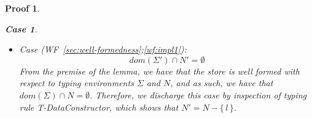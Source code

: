 \documentclass[showabstract,showacknowledgments,showpreface,showdedication,school]{iuphd}
\newtheorem*{bcase}{Case}
\theoremstyle{nonumberplain}
\newtheorem{nproof}{Proof}
\newcommand{\keywd}[1]{\mathit{#1}}
\newcommand{\skeywd}[1]{\mathit{#1}}
\newcommand{\TYP}{\keywd{\tau}}
\newcommand{\loc}{\skeywd{l}}
\newcommand{\concreteloc}[3]{\ensuremath{\langle #1, #2 \rangle ^{#3}}}
\newcommand{\reg}{\skeywd{r}}
\newcommand{\STOR}{\keywd{S}}
\newcommand\set[1]{\{ \, \ensuremath{#1} \,\}}
\newcommand{\SENV}{\keywd{\Sigma}}
\newcommand{\MENV}{\keywd{M}}
\newcommand{\AENV}{\keywd{A}}
\newcommand{\NENV}{\keywd{N}}
\newcommand{\locreg}[2]{\ensuremath{{#1}^{#2}}}
\newcommand{\allocptr}[2]{\keywd{MaxIdx}(#1,#2)}
\newcommand{\ewitness}[4]{\ensuremath{#1;#2;#3 \vdash_{ew} #4}}
\newcommand{\refwellformed}[2]{WF~\ref{#1};\ref{#2}}
\newcommand{\tdatacon}{T-DataConstructor}
\newcommand{\tconcreteloc}{T-Concrete-Loc}
\newcommand{\overharpoon}[1]{\overrightharpoon{#1}}
\begin{document}
\begin{nproof}
\begin{bcase}
\begin{itemize}
\begin{itemize}
\begin{itemize}
      \refwellformed{sec:well-formedness-allocation}{wf:impl-linear-alloc2}
      to the end witness of the last constructor argument, i.e.,
      \begin{align*}
      (\reg \mapsto \overharpoon{\locreg{\loc}{\reg}_n}) \in A \wedge
    \, (\overharpoon{\locreg{\loc}{\reg}_n} \mapsto \concreteloc{\reg}{\overharpoon{w_n}}{}) \in \MENV \wedge
    \, \ewitness{\TYP}{\concreteloc{\reg}{\overharpoon{w_n}}{}}{\STOR}{\concreteloc{\reg}{\overharpoon{w_{n+1}}}{}}
      \end{align*}
      The first two conjuncts follow from inversion on \tdatacon{}
      and \tconcreteloc{}, respectively, and the final one from Property~\ref{prf:dc-ew-f2}.
      Thus, we have that $\overharpoon{w_{n+1}} > \allocptr{\reg}{\STOR}$.
      It follows that $\overharpoon{w_{n+1}} > \allocptr{\reg}{\STOR'}$, because the
      newly written address in $\STOR'$, namely $i_1$, is such that $i_1 < \overharpoon{w_{n+1}}$.
      By defintion of the end witness, we discharge this case by establishing that
      $\overharpoon{w_{n+1}} = i_2 > \allocptr{\reg}{\STOR'}$.
      \end{itemize}
      The final obligation of this case concerns the requirement
      \refwellformed{sec:well-formedness-allocation}{wf:impl-empty-region}.
      Part of this obligation is given by the premise of this lemma, for the original
      store $\STOR$, and yields in particular that,
      for each $(\reg' \mapsto \emptyset) \in \AENV$, it
      is the case that $\reg' \not \in dom(\STOR)$.
      The remaining obligation is to show the property holds for the new store
      $\STOR'$, which discharges immediately because, although $\reg \in \STOR'$,
      by inversion on \tdatacon{}, it must be that
      $(\reg \mapsto \emptyset) \not \in \AENV$.
      \item
      Case (\refwellformed{sec:well-formedness}{wf:impl1}):
      \begin{displaymath}
      dom(\SENV') \cap \NENV' = \emptyset
      \end{displaymath}
      From the premise of the lemma, we have that the store is well formed with respect to typing
      environments $\SENV$ and $\NENV$, and as such, we have that
      $dom(\SENV) \cap \NENV = \emptyset$.
      Therefore, we discharge this case by inspection of typing rule \tdatacon{}, which
      shows that $N' = N - \set{\loc}$.
    \end{itemize}
    \end{itemize}
  \end{bcase}


\end{nproof}
\end{document}
